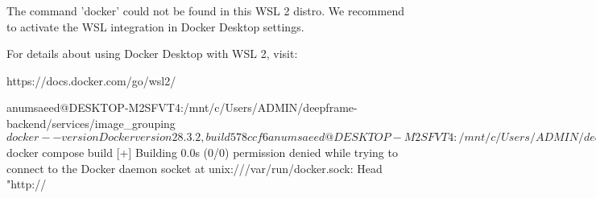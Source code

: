 The command 'docker' could not be found in this WSL 2 distro.
We recommend to activate the WSL integration in Docker Desktop settings.

For details about using Docker Desktop with WSL 2, visit:

https://docs.docker.com/go/wsl2/

anumsaeed@DESKTOP-M2SFVT4:/mnt/c/Users/ADMIN/deepframe-backend/services/image_grouping$ docker --version
Docker version 28.3.2, build 578ccf6
anumsaeed@DESKTOP-M2SFVT4:/mnt/c/Users/ADMIN/deepframe-backend/services/image_grouping$ docker compose build
[+] Building 0.0s (0/0)
permission denied while trying to connect to the Docker daemon socket at unix:///var/run/docker.sock: Head "http://%

